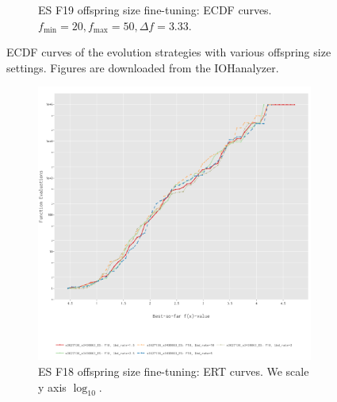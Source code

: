 \documentclass{article}
\begin{document}
\begin{figure}[!ht]
\begin{subfigure}[h]{0.95\linewidth}
        \caption{ES F19 offspring size fine-tuning: ECDF curves. $f_{\min} = 20, f_{\max} = 50, \Delta f = 3.33$.}
    \end{subfigure}
    \caption{ECDF curves of the evolution strategies with various offspring size settings. Figures are downloaded from the IOHanalyzer.}
    \label{fig:experi-es-osize-ecdf}
\end{figure}

\begin{figure}[!ht]
    \begin{subfigure}[h]{0.95\linewidth}
        \includegraphics[width=\linewidth]{es/f18/ERT18lbd.png}
        \caption{ES F18 offspring size fine-tuning: ERT curves. We scale y axis $\log_{10}$.}
    \end{subfigure}
    \hfill
    \begin{subfigure}[h]{0.95\linewidth}

\end{subfigure}
\end{figure}
\end{document}

